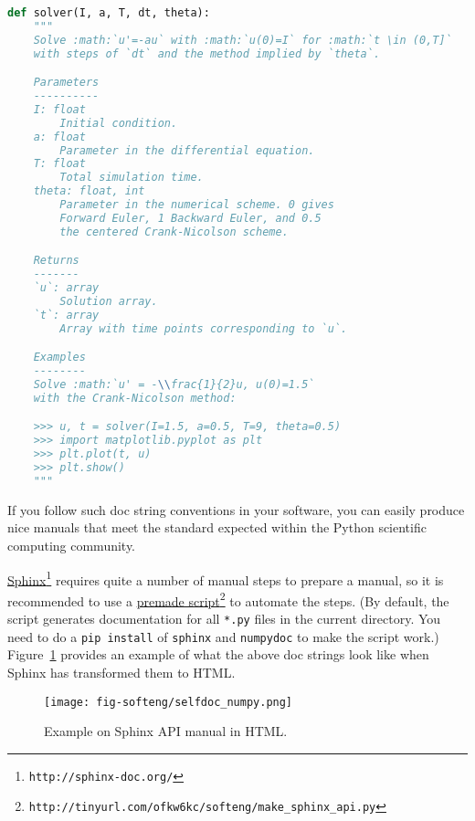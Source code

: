 \documentclass[graybox,sectrefs,envcountresetchap,open=right,final]{svmonodo}
\begin{document}
\begin{lstlisting}[language=python,style=blue1_bluegreen]
def solver(I, a, T, dt, theta):
    """
    Solve :math:`u'=-au` with :math:`u(0)=I` for :math:`t \in (0,T]`
    with steps of `dt` and the method implied by `theta`.

    Parameters
    ----------
    I: float
        Initial condition.
    a: float
        Parameter in the differential equation.
    T: float
        Total simulation time.
    theta: float, int
        Parameter in the numerical scheme. 0 gives
        Forward Euler, 1 Backward Euler, and 0.5
        the centered Crank-Nicolson scheme.

    Returns
    -------
    `u`: array
        Solution array.
    `t`: array
        Array with time points corresponding to `u`.

    Examples
    --------
    Solve :math:`u' = -\\frac{1}{2}u, u(0)=1.5`
    with the Crank-Nicolson method:

    >>> u, t = solver(I=1.5, a=0.5, T=9, theta=0.5)
    >>> import matplotlib.pyplot as plt
    >>> plt.plot(t, u)
    >>> plt.show()
    """

\end{lstlisting}

If you follow such doc string conventions in your software, you can
easily produce nice manuals that meet the standard expected within
the Python scientific computing community.

\href{{http://sphinx-doc.org/}}{Sphinx}\footnote{\texttt{http://sphinx-doc.org/}} requires quite a number of manual steps to
prepare a manual, so it is
recommended to use a \href{{http://tinyurl.com/ofkw6kc/softeng/make_sphinx_api.py}}{premade script}\footnote{\texttt{http://tinyurl.com/ofkw6kc/softeng/make\_sphinx\_api.py}} to automate the steps. (By default,
the script generates documentation for all \texttt{*.py} files in the
current directory.
You need to do a \texttt{pip install} of \texttt{sphinx} and \texttt{numpydoc} to make the
script work.)
Figure~\ref{softeng1:basic:docstring:fig} provides an example of what
the above doc strings look like when Sphinx has transformed them to HTML.

\begin{figure}[!ht]  %
  \centerline{\texttt{[image: fig-softeng/selfdoc\_numpy.png]}}
  \caption{
  Example on Sphinx API manual in HTML. \label{softeng1:basic:docstring:fig}
  }
\end{figure}
\end{document}
